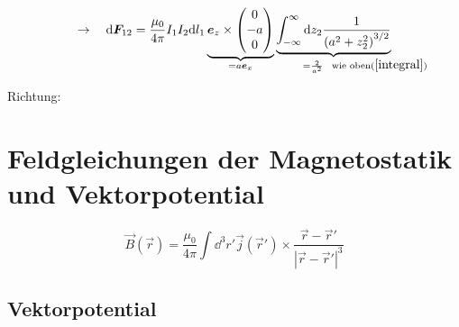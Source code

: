 \noindent
\begin{minipage}{.75\linewidth}
	\begin{align*}
	\rightarrow \quad \dd \vec{F}_{12} = \frac{\mu_0}{4 \pi} I_1 I_2 \dd l_1 \ub{\vec{e}_z \times \begin{pmatrix}
		0 \\ -a \\ 0
		\end{pmatrix}}_{= a \vec{e}_x} \ub{\int_{-\infty}^{\infty} \dd z_2 \frac{1}{\left(a^2 + z_2^2\right)^{3/2}}}_{\mathclap{\quad \qquad \qquad = \frac{2}{a^2} \ \ \tx{wie oben} (\ref{integral})}}
	\end{align*}
\end{minipage}%
\begin{minipage}{.25\linewidth}
	Richtung:\\
	\flushright
\end{minipage}%
\begin{center}
	\begin{minipage}{.5\linewidth}
	\end{minipage}
\end{center}

\section{Feldgleichungen der Magnetostatik und Vektorpotential}

\begin{equation*}
\vec{B}(\vec{r}) = \frac{\mu_0}{4 \pi} \int \dd^3 r' \vec{j}(\vec{r}') \times \frac{\vec{r} - \vec{r}'}{|\vec{r} - \vec{r}'|^3}
\end{equation*}

\subsection{Vektorpotential}

